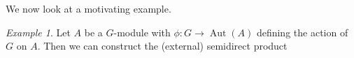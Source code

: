 \documentclass{dcthesis}
\newcommand{\defi}[1]{\textsf{#1}}
\newcommand{\wt}[1]{\widetilde{#1}}
\DeclareMathOperator{\Aut}{Aut}
\numberwithin{equation}{section}
\theoremstyle{definition}
\newtheorem{definition}[equation]{Definition}
\theoremstyle{remark}
\newtheorem{example}[equation]{Example}
\begin{document}
{{    %
    We now look at a motivating example.
    \begin{example}
      \label{exm:semidirectproduct}
      Let $A$ be a $G$-module
      with $\phi\colon G\to\Aut(A)$
      defining the action of $G$ on $A$.
      Then we can construct
      the \defi{(external) semidirect product}

\end{example}}}
\end{document}
